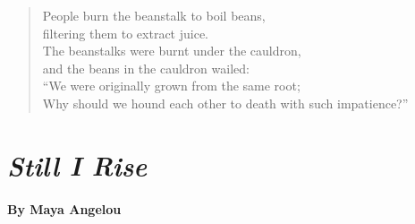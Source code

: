\vspace{2em}
\begin{verse}
	People burn the beanstalk to boil beans,\\
	filtering them to extract juice.\\
	The beanstalks were burnt under the cauldron,\\
	and the beans in the cauldron wailed:\\
	“We were originally grown from the same root;\\
	Why should we hound each other to death with such impatience?”
\end{verse}

\newpage
\section*{\emph{Still I Rise}}
\paragraph{By Maya Angelou}~

